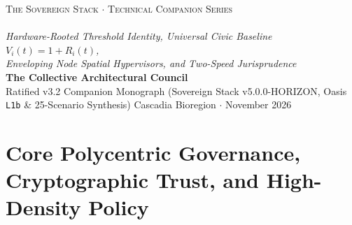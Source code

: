 \documentclass[11pt,a4paper]{book}
\DeclareRobustCommand{\_}{\ifmmode\text{\symbol{95}}\else\symbol{95}\allowbreak\fi}
\theoremstyle{plain}
\theoremstyle{definition}
\begin{document}
\frontmatter
\begin{titlepage}
    \thispagestyle{empty}
    \begin{center}
        \vspace*{3.2cm}
        {\Large \textsc{The Sovereign Stack $\cdot$ Technical Companion Series}} \\[1.2cm]
        {} \\[0.9cm]
        {\Large \textit{Hardware-Rooted Threshold Identity, Universal Civic Baseline $V_i(t) = 1 + R_i(t)$,}} \\[0.25cm]
        {\Large \textit{Enveloping Node Spatial Hypervisors, and Two-Speed Jurisprudence}} \\[2.6cm]
        {\large \textbf{The Collective Architectural Council}} \\[0.4cm]
        {\normalsize Ratified v3.2 Companion Monograph (Sovereign Stack v5.0.0-HORIZON, Oasis \texttt{L1b} \& 25-Scenario Synthesis)}
        \vfill
        {\large Cascadia Bioregion $\cdot$ November 2026}
        \vspace*{2.2cm}
    \end{center}
    \clearpage
\end{titlepage}

\tableofcontents



\mainmatter

\part{Core Polycentric Governance, Cryptographic Trust, and High-Density Policy}










\end{document}
